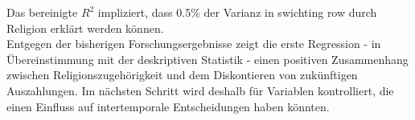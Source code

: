 \documentclass[11pt,a4paper]{article}
\begin{document}
Das bereinigte $R^2$ impliziert, dass 0.5\% der Varianz in swichting row durch Religion erklärt werden können.\\


Entgegen der bisherigen Forschungsergebnisse zeigt die erste Regression - in Übereinstimmung mit der deskriptiven Statistik - einen positiven Zusammenhang zwischen Religionszugehörigkeit und dem Diskontieren von zukünftigen Auszahlungen. Im nächsten Schritt wird deshalb für Variablen kontrolliert, die einen Einfluss auf intertemporale Entscheidungen haben könnten.\\ 

\end{document}
